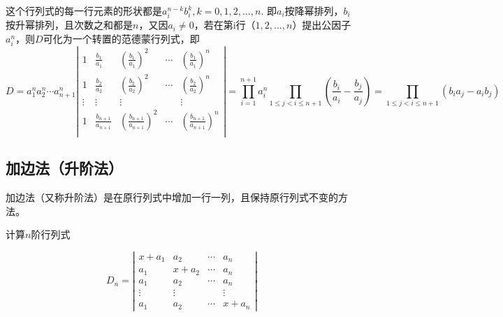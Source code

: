 \begin{solution}
    这个行列式的每一行元素的形状都是$a_{i}^{n-k}b_{i}^{k},k=0,1,2,...,n.$ 即$a_{i}$按降幂排列，$b_{i}$按升幂排列，且次数之和都是$n$，又因$a_{i}\ne 0$，若在第i行（$1,2,...,n$）提出公因子$a_{i}^{n}$，则$D$可化为一个转置的范德蒙行列式，即
    \small
$$
    D=a_{1}^{n}a_{2}^{n}\cdots a_{n+1}^{n}
    \left|\begin{array}{cccccc}
        1      & \frac{b_{1}}{a_{1}}     & (\frac{b_{1}}{a_{1}})^{2}     & \cdots & (\frac{b_{1}}{a_{1}})^{n}     \\
        1      & \frac{b_{2}}{a_{2}}     & (\frac{b_{2}}{a_{2}})^{2}     & \cdots & (\frac{b_{2}}{a_{2}})^{n}     \\
        \vdots & \vdots                  & \vdots                        &        & \vdots                        \\
        1      & \frac{b_{n+1}}{a_{n+1}} & (\frac{b_{n+1}}{a_{n+1}})^{2} & \cdots & (\frac{b_{n+1}}{a_{n+1}})^{n} \\
    \end{array}\right|
    =\prod_{i=1}^{n+1} a_{i}^{n}\prod_{1\le j< i\le n+1}^{} (\frac{b_{i}}{a_{i}}-\frac{b_{j}}{a_{j}})
    =\prod_{1\le j< i\le n+1}^{}(b_{i}a_{j}-a_{i}b_{j})
$$
\end{solution}

\subsection{加边法（升阶法）}

加边法（又称升阶法）是在原行列式中增加一行一列，且保持原行列式不变的方法。

\begin{example}
    计算$n$阶行列式

$$D_{n}=\left|\begin{array}{ccccccc}
        x+a_{1} & a_{2}   & \cdots & a_{n}   \\
        a_{1}   & x+a_{2} & \cdots & a_{n}   \\
        a_{1}   & a_{2}   & \cdots & a_{n}   \\
        \vdots  & \vdots  &        & \vdots  \\
        a_{1}   & a_{2}   & \cdots & x+a_{n}
    \end{array}\right|$$
\end{example}

